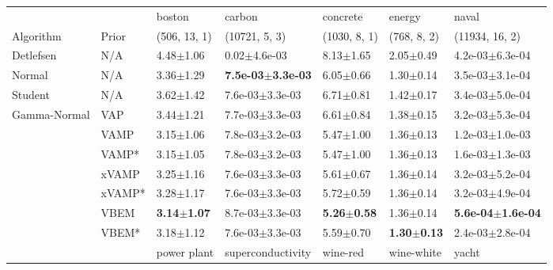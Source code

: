 \begin{tabular}{lllllll}
\toprule
             &       &                  boston &                        carbon &                concrete &                  energy &                         naval \\
Algorithm & Prior& (506, 13, 1)& (10721, 5, 3)& (1030, 8, 1)& (768, 8, 2)& (11934, 16, 2)\\
\midrule
Detlefsen & N/A &           4.48$\pm$1.06 &              0.02$\pm$4.6e-03 &           8.13$\pm$1.65 &           2.05$\pm$0.49 &           4.2e-03$\pm$6.3e-04 \\
Normal & N/A &           3.36$\pm$1.29 &  \textbf{7.5e-03$\pm$3.3e-03} &           6.05$\pm$0.66 &           1.30$\pm$0.14 &           3.5e-03$\pm$3.1e-04 \\
Student & N/A &           3.62$\pm$1.42 &           7.6e-03$\pm$3.3e-03 &           6.71$\pm$0.81 &           1.42$\pm$0.17 &           3.4e-03$\pm$5.0e-04 \\
Gamma-Normal & VAP &           3.44$\pm$1.21 &           7.7e-03$\pm$3.3e-03 &           6.61$\pm$0.84 &           1.38$\pm$0.15 &           3.2e-03$\pm$5.3e-04 \\
             & VAMP &           3.15$\pm$1.06 &           7.8e-03$\pm$3.2e-03 &           5.47$\pm$1.00 &           1.36$\pm$0.13 &           1.2e-03$\pm$1.0e-03 \\
             & VAMP* &           3.15$\pm$1.05 &           7.8e-03$\pm$3.2e-03 &           5.47$\pm$1.00 &           1.36$\pm$0.13 &           1.6e-03$\pm$1.3e-03 \\
             & xVAMP &           3.25$\pm$1.16 &           7.6e-03$\pm$3.3e-03 &           5.61$\pm$0.67 &           1.36$\pm$0.14 &           3.2e-03$\pm$5.2e-04 \\
             & xVAMP* &           3.28$\pm$1.17 &           7.6e-03$\pm$3.3e-03 &           5.72$\pm$0.59 &           1.36$\pm$0.14 &           3.2e-03$\pm$4.9e-04 \\
             & VBEM &  \textbf{3.14$\pm$1.07} &           8.7e-03$\pm$3.3e-03 &  \textbf{5.26$\pm$0.58} &           1.36$\pm$0.14 &  \textbf{5.6e-04$\pm$1.6e-04} \\
             & VBEM* &           3.18$\pm$1.12 &           7.6e-03$\pm$3.3e-03 &           5.59$\pm$0.70 &  \textbf{1.30$\pm$0.13} &           2.4e-03$\pm$2.8e-04 \\
\midrule
             &       &             power plant &        superconductivity &                wine-red &              wine-white &                   yacht \\

\end{tabular}
